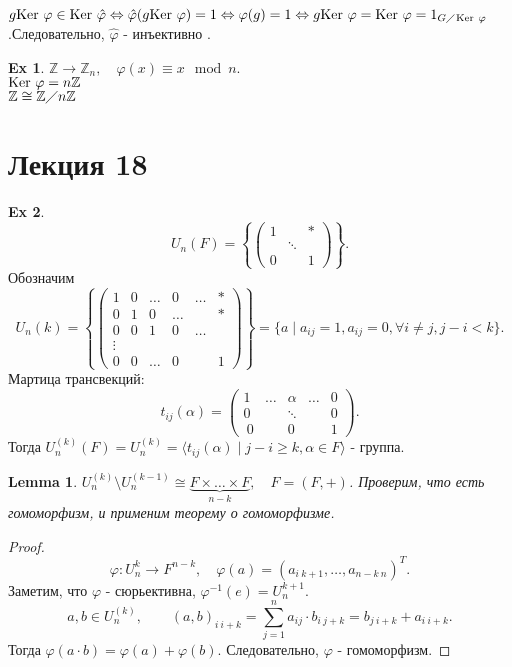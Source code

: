 \documentclass[11pt]{book}
\newcommand{\Z}{\mathbb{Z}}
\newcommand{\slim}{\sum\limits}
\newcommand{\ke}{{\mathop{\text{\rm Ker}}}~}
\theoremstyle{definition}
\theoremstyle{plain}
\theoremstyle{plain}
\newtheorem*{lm}{Lemma}
\theoremstyle{definition}
\newtheorem*{ex}{Ex}
\theoremstyle{remark}
\begin{document}
$g \ke \varphi  \in  \ke \hat{ \varphi } \Leftrightarrow \hat{ \varphi}(g \ke \varphi ) = 1 \Leftrightarrow \varphi (g) = 1 \Leftrightarrow g \ke \varphi  = \ke \varphi  = 1_{G \diagup \ke \varphi }$.Следовательно, $\hat{\varphi }$ - инъективно .
\begin{ex}
    $\Z \to \Z_n, \quad \varphi (x) \equiv x \mod n$.\\
    $\ke \varphi  = n \Z$\\
    $\Z \cong \Z \diagup n\Z$
\end{ex}
\section{Лекция 18}
\begin{ex}
\[
    U_n(F)  = \left \{ 
	\left ( 
	\begin{array}{ccc}
	    1 &  & * \\
	      & \ddots & \\
	    0 & & 1
	\end{array}
	\right )
    \right \}
.\] 
Обозначим  \[
    U_n {(k)} = 
    \left \{
	\left ( 
	\begin{array}{cccccc}
	    1 & 0 & \ldots & 0 & \ldots & * \\
	    0 & 1 & 0 & \ldots & & * \\
	    0 & 0 & 1 & 0 &\ldots& \\
	    \vdots &&&&\\
	    0 & 0 & \ldots & 0 && 1
	\end{array}
	\right )
    \right \}
	=
	\{a \mid a_{ij} = 1, a_{ij} = 0, \forall i \ne j, j - i < k\}
.\] 
Мартица трансвекций:
\[
    t_{ij}(\alpha ) = 
    \left ( 
    \begin{array}{ccccc}
	1 & \ldots & \alpha & \ldots  & 0 \\
	0 && \ddots && 0\\\
	0 &&0&& 1
    \end{array}
    \right )
.\] 
Тогда $U^{(k)} _ n(F) = U _n^{(k)} = \langle t_{ij} (\alpha ) \mid j -i \ge  k, \alpha  \in  F \rangle$ - группа.
\begin{lm}
    $U_n^{(k)} \setminus U_n ^{(k-1)} \cong \underbrace {F \times \ldots \times F}_{n-k}, \quad F= (F, +)$. Проверим, что есть гомоморфизм, и применим теорему о гомоморфизме.
\end{lm}
\begin{proof}
\[
    \varphi : U_n ^k \to F^{n-k}, \quad \varphi (a) = (a_{i~ k+1}, \ldots , a_{n-k~ n})^T
.\] 
Заметим, что $\varphi$ - сюрьективна, $\varphi ^{-1} (e) = U^{k+1} _n$. 
\[
    a, b \in  U_n^{(k)} , \qquad (a, b) _{i~ i+k} = \slim _{j=1} ^n a_{ij} \cdot b_{i~ j+k} = b_{j~ i+k} + a_{i~ i+k}
.\] 
Тогда $\varphi (a \cdot b) = \varphi(a) + \varphi(b) $. Следовательно, $\varphi $ - гомоморфизм.
\end{proof}
\end{ex}
\end{document}
